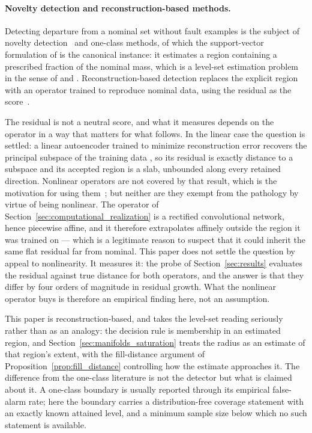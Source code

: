 \documentclass[a4paper]{cas-sc}
\begin{document}
\paragraph{Novelty detection and reconstruction-based methods.}
Detecting departure from a nominal set without fault examples is the subject
of novelty detection~\citep{bishop1994} and one-class methods, of which the
support-vector formulation of \citet{scholkopf1999,scholkopf2001} is the
canonical instance: it estimates a region containing a prescribed fraction of
the nominal mass, which is a level-set estimation problem in the sense of
\citet{devroye1980} and \citet{scott2006}. Reconstruction-based detection
replaces the explicit region with an operator trained to reproduce nominal
data, using the residual as the score~\citep{hinton2006,sakurada2014}.

The residual is not a neutral score, and what it measures depends on the
operator in a way that matters for what follows. In the linear case the
question is settled: a linear autoencoder trained to minimize reconstruction
error recovers the principal subspace of the training data
\citep{bourlard1988,baldi1989}, so its residual is exactly distance to a
subspace and its accepted region is a slab, unbounded along every retained
direction. Nonlinear operators are not covered by that result, which is the
motivation for using them~\citep{hinton2006}; but neither are they exempt from
the pathology by virtue of being nonlinear. The operator of
Section~\ref{sec:computational_realization} is a rectified convolutional
network, hence piecewise affine, and it therefore extrapolates affinely
outside the region it was trained on --- which is a legitimate reason to
suspect that it could inherit the same flat residual far from nominal.
This paper does not settle the question by appeal to nonlinearity. It
measures it: the probe of Section~\ref{sec:results} evaluates the residual
against true distance for both operators, and the answer is that they differ
by four orders of magnitude in residual growth. What the nonlinear operator
buys is therefore an empirical finding here, not an assumption.

This paper is reconstruction-based, and takes the level-set reading
seriously rather than as an analogy: the decision rule is membership in an
estimated region, and Section~\ref{sec:manifolds_saturation} treats the radius
as an estimate of that region's extent, with the fill-distance argument of
Proposition~\ref{prop:fill_distance} controlling how the estimate approaches
it. The difference from the one-class literature is not the detector but what
is claimed about it. A one-class boundary is usually reported through its
empirical false-alarm rate; here the boundary carries a distribution-free
coverage statement with an exactly known attained level, and a minimum sample
size below which no such statement is available.
\end{document}
